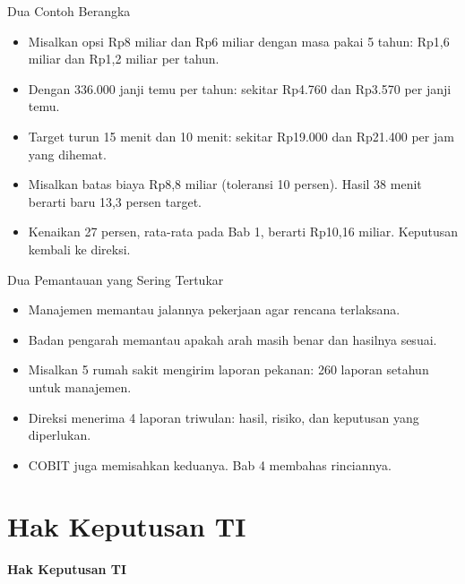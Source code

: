 \documentclass[aspectratio=169, table, 12pt]{beamer}
\begin{document}
\begin{frame}{{\Large Dua Contoh Berangka}}
  \vspace{4pt}
  \small
  \begin{itemize}
    \item Misalkan opsi Rp8 miliar dan Rp6 miliar dengan masa pakai 5 tahun: Rp1,6 miliar dan Rp1,2
          miliar per tahun.
    \item Dengan 336.000 janji temu per tahun: sekitar Rp4.760 dan Rp3.570 per janji temu.
    \item Target turun 15 menit dan 10 menit: sekitar Rp19.000 dan Rp21.400 per jam yang dihemat.
    \item Misalkan batas biaya Rp8,8 miliar (toleransi 10 persen). Hasil 38 menit berarti baru 13,3
          persen target.
    \item Kenaikan 27 persen, rata-rata pada Bab 1, berarti Rp10,16 miliar. Keputusan kembali ke
          direksi.
  \end{itemize}
\end{frame}

\begin{frame}{{\Large Dua Pemantauan yang Sering Tertukar}}
  \vspace{4pt}
  \small
  \begin{itemize}
    \item Manajemen memantau jalannya pekerjaan agar rencana terlaksana.
    \item Badan pengarah memantau apakah arah masih benar dan hasilnya sesuai.
    \item Misalkan 5 rumah sakit mengirim laporan pekanan: 260 laporan setahun untuk manajemen.
    \item Direksi menerima 4 laporan triwulan: hasil, risiko, dan keputusan yang diperlukan.
    \item COBIT juga memisahkan keduanya. Bab 4 membahas rinciannya.
  \end{itemize}
\end{frame}

\section{Hak Keputusan TI}

\begin{frame}{\hfill}
  \centering
  \Huge{\textbf{Hak Keputusan TI}}
\end{frame}
\end{document}
